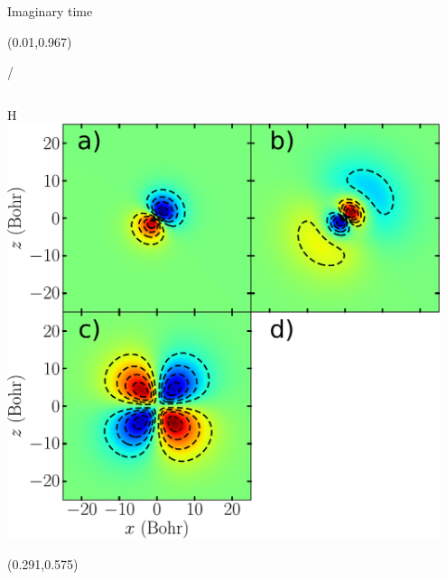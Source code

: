 \documentclass{beamer}
\makeatletter
\newcommand{\framenumber}{
\begin{textblock}{0}(0.01,0.967)
\begin{scriptsize}
{\color{gray}\insertframenumber/\inserttotalframenumber}
\end{scriptsize}
\end{textblock}
}
\makeatother
\begin{document}
\begin{frame}{Imaginary time}\framenumber{}
   \begin{columns}[t]
        \begin{center}
        H \\
        \includegraphics[width=0.95\textwidth]{figures/h_eigenstates}

        \begin{textblock}{0.2}(0.291,0.575)
        \end{textblock}
        \end{center}


\end{columns}
\end{frame}
\end{document}
